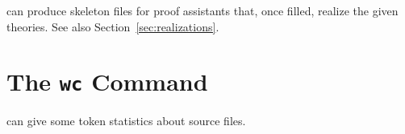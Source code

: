 \why can produce skeleton files for proof assistants that, once filled,
realize the given theories. See also Section~\ref{sec:realizations}.

\section{The \texttt{wc} Command}
\label{sec:why3wc}

\why can give some token statistics about \whyml source files.

